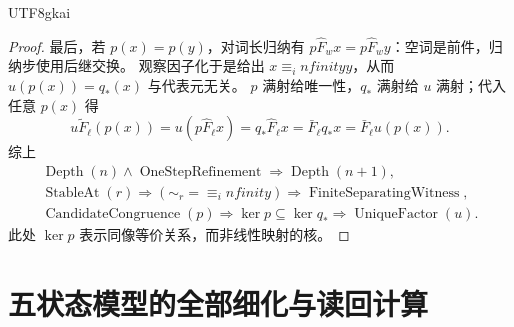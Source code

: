 \documentclass[12pt,a4paper,openany,notitlepage]{report}
\theoremstyle{plain}
\theoremstyle{definition}
\theoremstyle{remark}
\def\infty{infinity}\def\Gamma{Gamma}\def\Phi{Phi}%
\begin{document}
\begin{CJK*}{UTF8}{gkai}
\begin{proof}
最后，若 $p(x)=p(y)$，对词长归纳有
$p\widehat F_wx=p\widehat F_wy$：空词是前件，归纳步使用后继交换。
观察因子化于是给出 $x\equiv_\infty y$，从而
$u(p(x))=q_*(x)$ 与代表元无关。
$p$ 满射给唯一性，$q_*$ 满射给 $u$ 满射；代入任意 $p(x)$ 得
\[
 u\widetilde F_\ell(p(x))
 =u(p\widehat F_\ell x)
 =q_*\widehat F_\ell x
 =\bar F_\ell q_*x
 =\bar F_\ell u(p(x)).
\]
综上
\[
\begin{gathered}
 \operatorname{Depth}(n)\land\operatorname{OneStepRefinement}
 \Rightarrow\operatorname{Depth}(n+1),\\
 \operatorname{StableAt}(r)
 \Rightarrow (\sim_r=\equiv_\infty)
 \Rightarrow\operatorname{FiniteSeparatingWitness},\\
 \operatorname{CandidateCongruence}(p)
 \Rightarrow\ker p\subseteq\ker q_*
 \Rightarrow\operatorname{UniqueFactor}(u).
\end{gathered}
\]
此处 $\ker p$ 表示同像等价关系，而非线性映射的核。
\end{proof}

\section{五状态模型的全部细化与读回计算}
\label{exp:gov:finite-example-section}


\end{CJK*}
\end{document}
